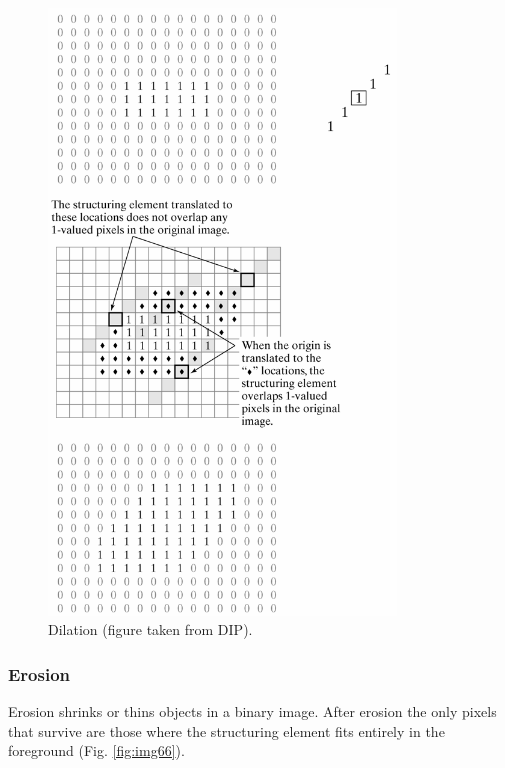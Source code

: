  \begin{figure}[htbp]
 \begin{center}
 \includegraphics[width=9.222cm]{fig/CMCIBasicCourse201102-img65.png}
 \caption{ Dilation (figure taken from DIP).}
 \label{fig:img65}
 \end{center}
 \end{figure}



\subsubsection{Erosion}
Erosion shrinks or thins objects in a binary image. After erosion the
only pixels that survive are those where the structuring element fits
entirely in the foreground (Fig. \ref{fig:img66}).

